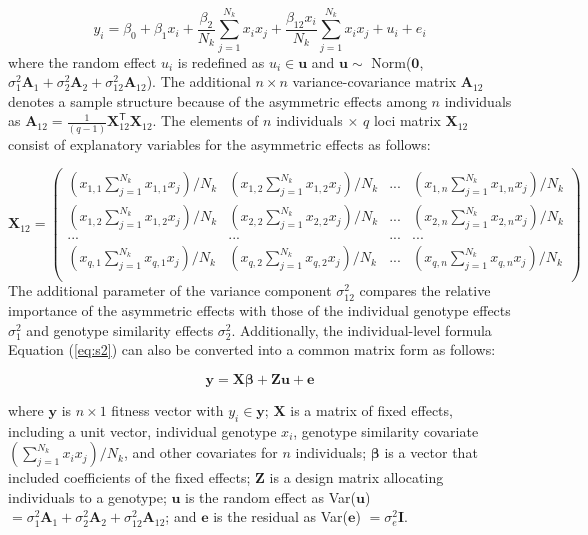 \documentclass[12pt,]{article}
\begin{document}
\begin{equation}
y_i = \beta_0 + \beta_1x_i + \frac{\beta_2}{N_k}\sum^{N_{k}}_{j=1}{x_ix_j} + \frac{\beta_{12}x_i}{N_k}\sum^{N_{k}}_{j=1}{x_ix_j} + u_i + e_i \label{eq:s2}
\end{equation}
\noindent
where the random effect $u_i$ is redefined as $u_i \in \mathbf{u}$ and $\mathbf{u} \sim$ Norm($\mathbf{0}$, $\sigma^2_1\mathbf{A}_1+\sigma^2_2\mathbf{A}_2+\sigma^2_{12}\mathbf{A}_{12}$). The additional $n \times n$ variance-covariance matrix $\mathbf{A}_{12}$ denotes a sample structure because of the asymmetric effects among $n$ individuals as $\mathbf{A}_{12}=\frac{1}{(q-1)}\mathbf{X}_{12}^\mathsf{T} \mathbf{X}_{12}$. The elements of $n$ individuals $\times$ $q$ loci matrix $\mathbf{X}_{12}$ consist of explanatory variables for the asymmetric effects as follows:

$$\mathbf{X}_{12}=\left(\begin{array}{cccc}
    (x_{1,1}\sum^{N_k}_{j=1}x_{1,1} x_j)/N_k &  (x_{1,2}\sum^{N_k}_{j=1}x_{1,2} x_j)/N_k &  ... &  (x_{1,n}\sum^{N_k}_{j=1}x_{1,n} x_j)/N_k \\ 
    (x_{1,2}\sum^{N_k}_{j=1}x_{1,2} x_j)/N_k &  (x_{2,2}\sum^{N_k}_{j=1}x_{2,2} x_j)/N_k &  ... &  (x_{2,n}\sum^{N_k}_{j=1}x_{2,n} x_j)/N_k\\
    ... & ... & ... & ... \\
    (x_{q,1}\sum^{N_k}_{j=1}x_{q,1} x_j)/N_k &  (x_{q,2}\sum^{N_k}_{j=1}x_{q,2} x_j)/N_k &  ... &  (x_{q,n}\sum^{N_k}_{j=1}x_{q,n} x_j)/N_k \\
    \end{array} \right)
$$
The additional parameter of the variance component $\sigma^2_{12}$ compares the relative importance of the asymmetric effects with those of the individual genotype effects $\sigma^2_1$ and genotype similarity effects $\sigma^2_2$.
Additionally, the individual-level formula Equation (\ref{eq:s2}) can also be converted into a common matrix form \citep{henderson1959estimation} as follows:

\begin{equation}
    \mathbf{y}=\mathbf{X}\bm{\beta}+\mathbf{Zu}+\mathbf{e} \label{eq:s3}
\end{equation}

\noindent
where $\mathbf{y}$ is $n \times 1$ fitness vector with $y_i \in \mathbf{y}$; $\mathbf{X}$ is a matrix of fixed effects, including a unit vector, individual genotype $x_i$, genotype similarity covariate $(\sum^{N_k}_{j=1}x_i x_j)/N_k$, and other covariates for $n$ individuals; $\bm{\beta}$ is a vector that included coefficients of the fixed effects; $\mathbf{Z}$ is a design matrix allocating individuals to a genotype; $\mathbf{u}$ is the random effect as Var($\mathbf{u}$) $=\sigma^2_1\mathbf{A}_1+\sigma^2_2\mathbf{A}_2+\sigma^2_{12}\mathbf{A}_{12}$; and $\mathbf{e}$ is the residual as Var($\mathbf{e}$) $=\sigma^2_e\mathbf{I}$. 
\end{document}
